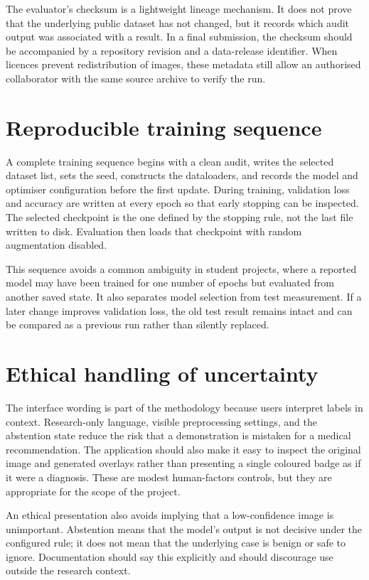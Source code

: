 The evaluator's checksum is a lightweight lineage mechanism. It does not prove that the underlying public dataset has not changed, but it records which audit output was associated with a result. In a final submission, the checksum should be accompanied by a repository revision and a data-release identifier. When licences prevent redistribution of images, these metadata still allow an authorised collaborator with the same source archive to verify the run.

\section{Reproducible training sequence}
A complete training sequence begins with a clean audit, writes the selected dataset list, sets the seed, constructs the dataloaders, and records the model and optimiser configuration before the first update. During training, validation loss and accuracy are written at every epoch so that early stopping can be inspected. The selected checkpoint is the one defined by the stopping rule, not the last file written to disk. Evaluation then loads that checkpoint with random augmentation disabled.

This sequence avoids a common ambiguity in student projects, where a reported model may have been trained for one number of epochs but evaluated from another saved state. It also separates model selection from test measurement. If a later change improves validation loss, the old test result remains intact and can be compared as a previous run rather than silently replaced.

\section{Ethical handling of uncertainty}
The interface wording is part of the methodology because users interpret labels in context. Research-only language, visible preprocessing settings, and the abstention state reduce the risk that a demonstration is mistaken for a medical recommendation. The application should also make it easy to inspect the original image and generated overlays rather than presenting a single coloured badge as if it were a diagnosis. These are modest human-factors controls, but they are appropriate for the scope of the project.

An ethical presentation also avoids implying that a low-confidence image is unimportant. Abstention means that the model's output is not decisive under the configured rule; it does not mean that the underlying case is benign or safe to ignore. Documentation should say this explicitly and should discourage use outside the research context.
